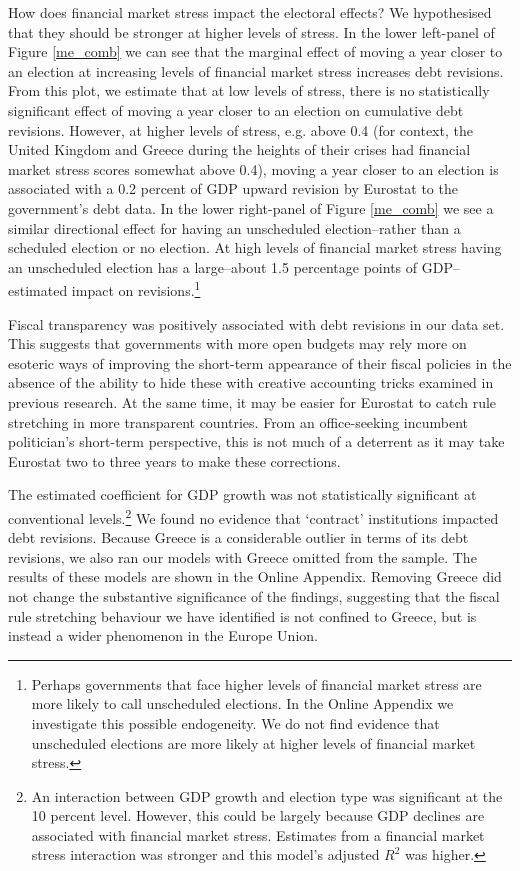 \documentclass[]{article}
\begin{document}
How does financial market stress impact the electoral effects? We hypothesised that they should be stronger at higher levels of stress. In the lower left-panel of Figure \ref{me_comb} we can see that the marginal effect of moving a year closer to an election at increasing levels of financial market stress increases debt revisions. From this plot, we estimate that at low levels of stress, there is no statistically significant effect of moving a year closer to an election on cumulative debt revisions. However, at higher levels of stress, e.g. above 0.4 (for context, the United Kingdom and Greece during the heights of their crises had financial market stress scores somewhat above 0.4), moving a year closer to an election is associated with a 0.2 percent of GDP upward revision by Eurostat to the government's debt data. In the lower right-panel of Figure \ref{me_comb} we see a similar directional effect for having an unscheduled election--rather than a scheduled election or no election. At high levels of financial market stress having an unscheduled election has a large--about 1.5 percentage points of GDP--estimated impact on revisions.\footnote{Perhaps governments that face higher levels of financial market stress are more likely to call unscheduled elections. In the Online Appendix we investigate this possible endogeneity. We do not find evidence that unscheduled elections are more likely at higher levels of financial market stress.}

Fiscal transparency was positively associated with debt revisions in our data set. This suggests that governments with more open budgets may rely more on esoteric ways of improving the short-term appearance of their fiscal policies in the absence of the ability to hide these with creative accounting tricks examined in previous research. At the same time, it may be easier for Eurostat to catch rule stretching in more transparent countries. From an office-seeking incumbent politician's short-term perspective, this is not much of a deterrent as it may take Eurostat two to three years to make these corrections.

The estimated coefficient for GDP growth was not statistically significant at conventional levels.\footnote{An interaction between GDP growth and election type was significant at the 10 percent level. However, this could be largely because GDP declines are associated with financial market stress. Estimates from a financial market stress interaction was stronger and this model's adjusted $R^{2}$ was higher.} We found no evidence that `contract' institutions impacted debt revisions. Because Greece is a considerable outlier in terms of its debt revisions, we also ran our models with Greece omitted from the sample. The results of these models are shown in the Online Appendix. Removing Greece did not change the substantive significance of the findings, suggesting that the fiscal rule stretching behaviour we have identified is not confined to Greece, but is instead a wider phenomenon in the Europe Union.
\end{document}
